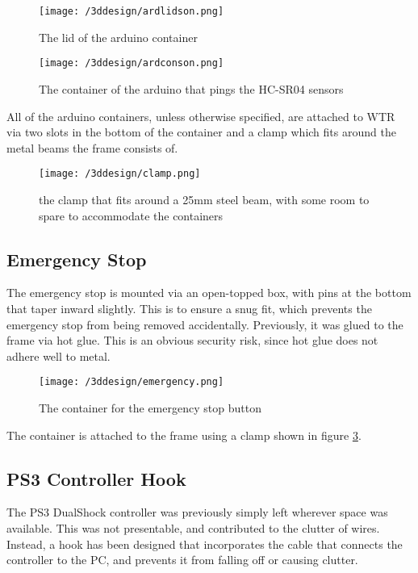 \begin{figure}[H]
\centering
\texttt{[image: /3ddesign/ardlidson.png]}
\caption{The lid of the arduino container}
\label{fig::ardLidSon}
\end{figure}

\begin{figure}[H]
\centering
\texttt{[image: /3ddesign/ardconson.png]}
\caption{The container of the arduino that pings the HC-SR04 sensors}
\label{fig::ardConSon}
\end{figure}

All of the arduino containers, unless otherwise specified, are attached to WTR via two slots in the bottom of the container and a clamp which fits around the metal beams the frame consists of.

\begin{figure}[H]
\centering
\texttt{[image: /3ddesign/clamp.png]}
\caption{the clamp that fits around a 25mm steel beam, with some room to spare to accommodate the containers}
\label{fig::clamp}
\end{figure}

\subsection{Emergency Stop}
The emergency stop is mounted via an open-topped box, with pins at the bottom that taper inward slightly.
This is to ensure a snug fit, which prevents the emergency stop from being removed accidentally.
Previously, it was glued to the frame via hot glue.
This is an obvious security risk, since hot glue does not adhere well to metal.

\begin{figure}[H]
\centering
\texttt{[image: /3ddesign/emergency.png]}
\caption{The container for the emergency stop button}
\label{fig::ESB}
\end{figure}

The container is attached to the frame using a clamp shown in figure \ref{fig::clamp}.

\subsection{PS3 Controller Hook}
The PS3 DualShock controller was previously simply left wherever space was available.
This was not presentable, and contributed to the clutter of wires.
Instead, a hook has been designed that incorporates the cable that connects the controller to the PC, and prevents it from falling off or causing clutter.


